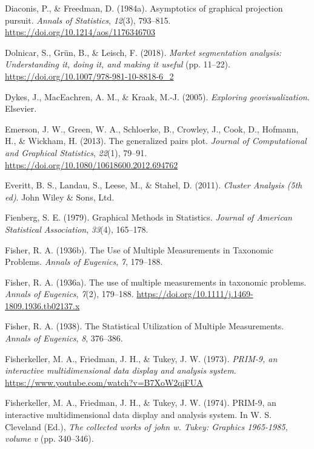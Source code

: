 \documentclass[
  letterpaper,
]{krantz}
\newlength{\cslhangindent}
\newenvironment{CSLReferences}[2] %
 {\begin{list}{}{%
  \setlength{\itemindent}{0pt}
  \setlength{\leftmargin}{0pt}
  \setlength{\parsep}{0pt}
  \ifodd #1
   \setlength{\leftmargin}{\cslhangindent}
   \setlength{\itemindent}{-1\cslhangindent}
  \fi
  \setlength{\itemsep}{#2\baselineskip}}}
 {\end{list}}
\begin{document}
\begin{CSLReferences}{1}{0}
Diaconis, P., \& Freedman, D. (1984a). Asymptotics of graphical
projection pursuit. \emph{Annals of Statistics}, \emph{12}(3), 793--815.
\url{https://doi.org/10.1214/aos/1176346703}

Dolnicar, S., Grün, B., \& Leisch, F. (2018). \emph{Market segmentation
analysis: Understanding it, doing it, and making it useful} (pp.
11--22). \url{https://doi.org/10.1007/978-981-10-8818-6_2}

Dykes, J., MacEachren, A. M., \& Kraak, M.-J. (2005). \emph{Exploring
geovisualization}. Elsevier.

Emerson, J. W., Green, W. A., Schloerke, B., Crowley, J., Cook, D.,
Hofmann, H., \& Wickham, H. (2013). The generalized pairs plot.
\emph{Journal of Computational and Graphical Statistics}, \emph{22}(1),
79--91. \url{https://doi.org/10.1080/10618600.2012.694762}

Everitt, B. S., Landau, S., Leese, M., \& Stahel, D. (2011).
\emph{Cluster {A}nalysis (5th ed)}. John Wiley \& Sons, Ltd.

Fienberg, S. E. (1979). Graphical {M}ethods in {S}tatistics.
\emph{Journal of American Statistical Association}, \emph{33}(4),
165--178.

Fisher, R. A. (1936b). The {U}se of {M}ultiple {M}easurements in
{T}axonomic {P}roblems. \emph{Annals of Eugenics}, \emph{7}, 179--188.

Fisher, R. A. (1936a). The use of multiple measurements in taxonomic
problems. \emph{Annals of Eugenics}, \emph{7}(2), 179--188.
\url{https://doi.org/10.1111/j.1469-1809.1936.tb02137.x}

Fisher, R. A. (1938). The {S}tatistical {U}tilization of {M}ultiple
{M}easurements. \emph{Annals of Eugenics}, \emph{8}, 376--386.

Fisherkeller, M. A., Friedman, J. H., \& Tukey, J. W. (1973).
\emph{{PRIM-9}, an interactive multidimensional data display and
analysis system}. \url{https://www.youtube.com/watch?v=B7XoW2qiFUA}

Fisherkeller, M. A., Friedman, J. H., \& Tukey, J. W. (1974). {PRIM-9},
an interactive multidimensional data display and analysis system. In W.
S. Cleveland (Ed.), \emph{The collected works of john w. Tukey: Graphics
1965-1985, volume v} (pp. 340--346).


\end{CSLReferences}
\end{document}
